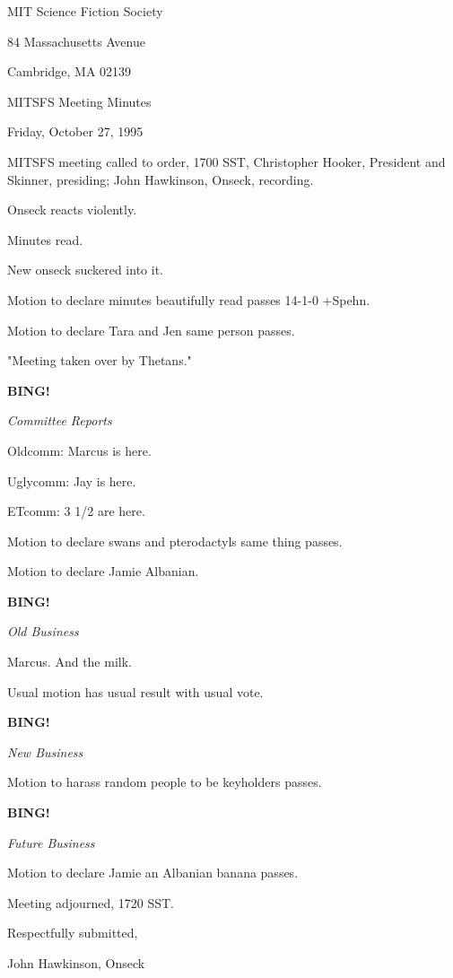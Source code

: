 \documentclass[12pt]{article}
\newcommand{\bing}{{\bf BING!} }
\newcommand{\goto}[1]{\bing \vskip 12pt \centerline{{\em{#1}}}}
\begin{document}
\begin{center}

MIT Science Fiction Society 

84 Massachusetts Avenue

Cambridge, MA 02139

\vspace{12pt}

MITSFS Meeting Minutes 

Friday, October 27, 1995

\end{center}
 
\vspace{18pt}

\setlength{\parskip}{6pt}

\noindent
MITSFS meeting called to order, 1700 SST,
Christopher Hooker, President and Skinner, presiding; John Hawkinson, Onseck, recording.

Onseck reacts violently.

Minutes read.

New onseck suckered into it.

Motion to declare minutes beautifully read passes 14-1-0 +Spehn.

Motion to declare Tara and Jen same person passes.

"Meeting taken over by Thetans."

\goto{Committee Reports}

Oldcomm: Marcus is here.

Uglycomm: Jay is here.

ETcomm: 3 1/2 are here.

Motion to declare swans and pterodactyls same thing passes.

Motion to declare Jamie Albanian.

\goto{Old Business}

Marcus. And the milk.

Usual motion has usual result with usual vote.

\goto{New Business}

Motion to harass random people to be keyholders passes.

\goto{Future Business}

Motion to declare Jamie an Albanian banana passes.

\vspace{12pt}

\noindent
Meeting adjourned, 1720 SST.

\vspace{18pt}

\centerline{Respectfully submitted,}
\centerline{John Hawkinson, Onseck}
\end{document}

